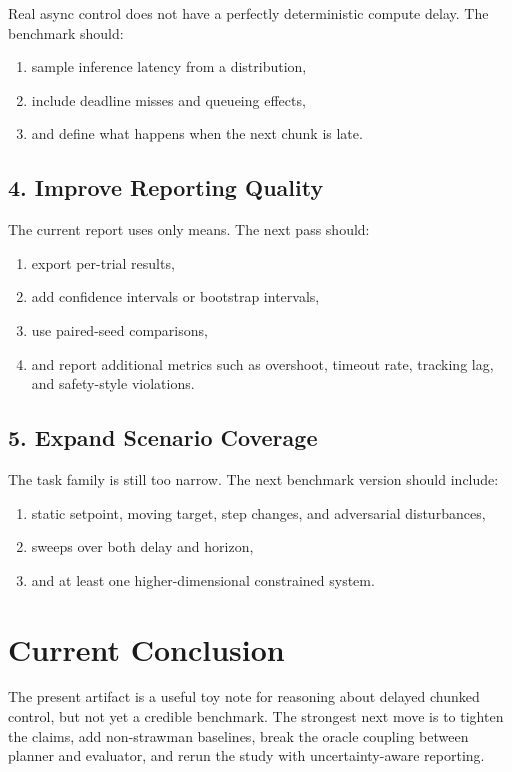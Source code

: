 \documentclass[11pt]{article}
\begin{document}
Real async control does not have a perfectly deterministic compute delay. The benchmark should:
\begin{enumerate}[leftmargin=1.5em]
  \item sample inference latency from a distribution,
  \item include deadline misses and queueing effects,
  \item and define what happens when the next chunk is late.
\end{enumerate}

\subsection{4. Improve Reporting Quality}

The current report uses only means. The next pass should:
\begin{enumerate}[leftmargin=1.5em]
  \item export per-trial results,
  \item add confidence intervals or bootstrap intervals,
  \item use paired-seed comparisons,
  \item and report additional metrics such as overshoot, timeout rate, tracking lag, and safety-style violations.
\end{enumerate}

\subsection{5. Expand Scenario Coverage}

The task family is still too narrow. The next benchmark version should include:
\begin{enumerate}[leftmargin=1.5em]
  \item static setpoint, moving target, step changes, and adversarial disturbances,
  \item sweeps over both delay and horizon,
  \item and at least one higher-dimensional constrained system.
\end{enumerate}

\section{Current Conclusion}

The present artifact is a useful toy note for reasoning about delayed chunked control, but not yet a credible benchmark. The strongest next move is to tighten the claims, add non-strawman baselines, break the oracle coupling between planner and evaluator, and rerun the study with uncertainty-aware reporting.
\end{document}
